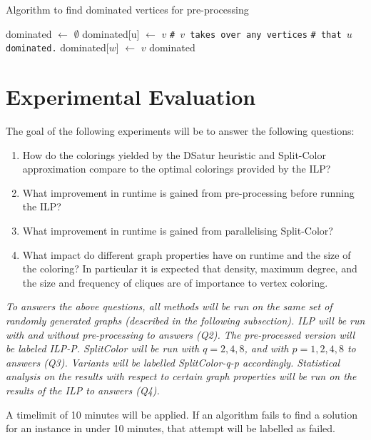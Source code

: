 \documentclass[twocolumn]{article}
\begin{document}
\begin{algorithm}
	\caption{Algorithm to find dominated vertices for pre-processing}
	\begin{algorithmic}
			\State dominated $\gets$ $\emptyset$
					\State dominated[u] $\gets$ $v$
					\State \texttt{\# $v$ takes over any vertices} 
					\State \texttt{\# that $u$ dominated.}
							\State dominated[$w$] $\gets$ $v$
						\EndIf
					\EndFor
				\EndIf
			\EndFor
			\State \Return dominated
		\EndFunction
	\end{algorithmic}
	\label{alg:dominated}
\end{algorithm}

\section{Experimental Evaluation}
The goal of the following experiments will be to answer the following questions:
\begin{enumerate}[(Q1)]
	\item How do the colorings yielded by the DSatur heuristic and Split-Color approximation compare to the optimal colorings provided by the ILP?
	\item What improvement in runtime is gained from pre-processing before running the ILP?
	\item What improvement in runtime is gained from parallelising Split-Color?
	\item What impact do different graph properties have on runtime and the size of the coloring? In particular it is expected that density, maximum degree, and the size and frequency of cliques are of importance to vertex coloring.
\end{enumerate}

\emph{To answers the above questions, all methods will be run on the same set of randomly generated graphs (described in the following subsection). ILP will be run with and without pre-processing to answers (Q2). The pre-processed version will be labeled ILP-P. SplitColor will be run with $q = 2, 4, 8$, and with $p = 1, 2, 4, 8$ to answers (Q3). Variants will be labelled SplitColor-q-p accordingly. Statistical analysis on the results with respect to certain graph properties will be run on the results of the ILP to answers (Q4).}

A timelimit of 10 minutes will be applied. If an algorithm fails to find a solution for an instance in under 10 minutes, that attempt will be labelled as failed.
\end{document}
